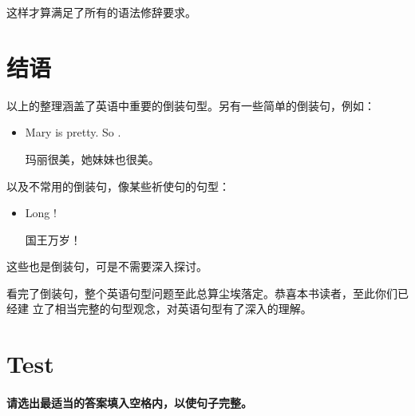 这样才算满足了所有的语法修辞要求。

\section{结语}

以上的整理涵盖了英语中重要的倒装句型。另有一些简单的倒装句，例如：
\begin{itemize}
\item Mary is pretty. So  .

  玛丽很美，她妹妹也很美。
\end{itemize}

以及不常用的倒装句，像某些祈使句的句型：
\begin{itemize}
\item Long  !

  国王万岁！
\end{itemize}
这些也是倒装句，可是不需要深入探讨。

看完了倒装句，整个英语句型问题至此总算尘埃落定。恭喜本书读者，至此你们已经建
立了相当完整的句型观念，对英语句型有了深入的理解。

\section{Test}

\paragraph{请选出最适当的答案填入空格内，以使句子完整。}

